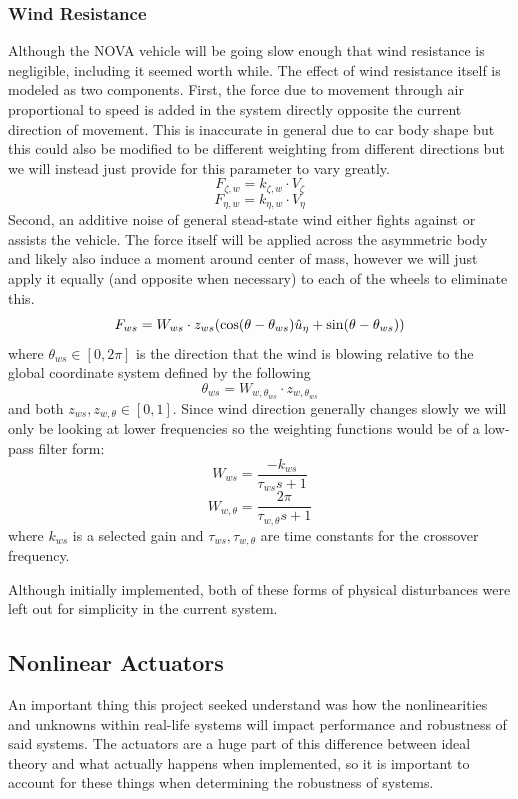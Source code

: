 \documentclass[conference, onecolumn]{IEEEtran}
\begin{document}
\subsubsection{Wind Resistance}
Although the NOVA vehicle will be going slow enough that wind resistance is negligible, including it seemed worth while. The effect of wind resistance itself is modeled as two components. 
First, the force due to movement through air proportional to speed is added in the system directly opposite the current direction of movement. 
This is inaccurate in general due to car body shape but this could also be modified to be different weighting from different directions but we will instead just provide for this parameter to vary greatly. \[
    F_{\zeta,w} = k_{\zeta,w} \cdot V_\zeta
\]\[
    F_{\eta,w} = k_{\eta,w} \cdot V_\eta
\]
Second, an additive noise of general stead-state wind either fights against or assists the vehicle. 
The force itself will be applied across the asymmetric body and likely also induce a moment around center of mass, however we will just apply it equally (and opposite when necessary) to each of the wheels to eliminate this. \[
    F_{ws} = W_{ws} \cdot z_{ws} \qty(\cos(\theta - \theta_{ws}) \hat{u}_\eta + \sin(\theta - \theta_{ws}))
\] where $\theta_{ws} \in [0, 2 \pi]$ is the direction that the wind is blowing relative to the global coordinate system defined by the following \[
    \theta_{ws} = W_{w,\theta_{ws}} \cdot z_{w,\theta_{ws}}
\] and both $z_{ws}, z_{w,\theta} \in [0,1]$.
Since wind direction generally changes slowly we will only be looking at lower frequencies so the weighting functions would be of a low-pass filter form: \[
    W_{ws} = \frac{-k_{ws}}{\tau_{ws} s + 1}
\] \[
    W_{w,\theta} = \frac{2\pi}{\tau_{w,\theta} s + 1}
\] where $k_{ws}$ is a selected gain and $\tau_{ws}, \tau_{w,\theta}$ are time constants for the crossover frequency.

Although initially implemented, both of these forms of physical disturbances were left out for simplicity in the current system.

\newpage
\subsection{Nonlinear Actuators}
An important thing this project seeked understand was how the nonlinearities and unknowns within real-life systems will impact performance and robustness of said systems. 
The actuators are a huge part of this difference between ideal theory and what actually happens when implemented, so it is important to account for these things when determining the robustness of systems. 
\end{document}
